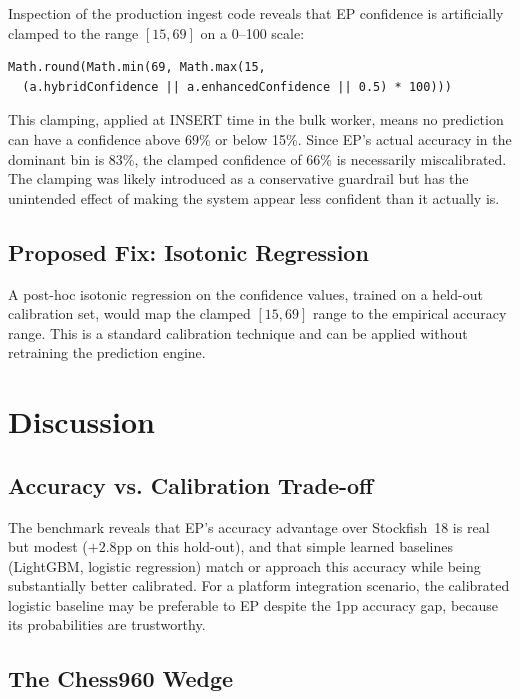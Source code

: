 \documentclass[11pt,a4paper]{article}
\begin{document}
Inspection of the production ingest code reveals that EP confidence is
artificially clamped to the range $[15, 69]$ on a 0--100 scale:

\begin{verbatim}
Math.round(Math.min(69, Math.max(15,
  (a.hybridConfidence || a.enhancedConfidence || 0.5) * 100)))
\end{verbatim}

This clamping, applied at INSERT time in the bulk worker, means no
prediction can have a confidence above 69\% or below 15\%. Since EP's
actual accuracy in the dominant bin is 83\%, the clamped confidence of
66\% is necessarily miscalibrated. The clamping was likely introduced as
a conservative guardrail but has the unintended effect of making the
system appear less confident than it actually is.

\subsection{Proposed Fix: Isotonic Regression}

A post-hoc isotonic regression on the confidence values, trained on a
held-out calibration set, would map the clamped $[15, 69]$ range to the
empirical accuracy range. This is a standard calibration technique
\cite{guo2017calibration} and can be applied without retraining the
prediction engine.

\section{Discussion}
\label{sec:discussion}

\subsection{Accuracy vs. Calibration Trade-off}

The benchmark reveals that EP's accuracy advantage over Stockfish~18 is
real but modest ($+2.8$pp on this hold-out), and that simple learned
baselines (LightGBM, logistic regression) match or approach this accuracy
while being substantially better calibrated. For a platform integration
scenario, the calibrated logistic baseline may be preferable to EP despite
the 1pp accuracy gap, because its probabilities are trustworthy.

\subsection{The Chess960 Wedge}
\end{document}
